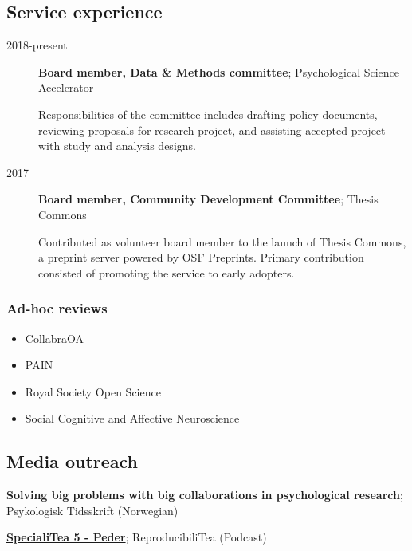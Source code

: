 \documentclass[]{article}
\providecommand{\tightlist}{%
  \setlength{\itemsep}{0pt}\setlength{\parskip}{0pt}}
\begin{document}
\subsection{Service experience}\label{service-experience}

\begin{description}
\item[2018-present]
\textbf{Board member, Data \& Methods committee}; Psychological Science
Accelerator

Responsibilities of the committee includes drafting policy documents,
reviewing proposals for research project, and assisting accepted project
with study and analysis designs.
\item[2017]
\textbf{Board member, Community Development Committee}; Thesis Commons

Contributed as volunteer board member to the launch of Thesis Commons, a
preprint server powered by OSF Preprints. Primary contribution consisted
of promoting the service to early adopters.
\end{description}

\subsubsection{Ad-hoc reviews}\label{ad-hoc-reviews}

\begin{itemize}
\tightlist
\item
  CollabraOA
\item
  PAIN
\item
  Royal Society Open Science
\item
  Social Cognitive and Affective Neuroscience
\end{itemize}

\subsection{Media outreach}\label{media-outreach}

\begin{description}
\tightlist
\item[2018]
\textbf{Solving big problems with big collaborations in psychological
research}; Psykologisk Tidsskrift (Norwegian)\\
\item[2018]
\textbf{\href{https://soundcloud.com/reproducibilitea/specialitea-5-peder}{SpecialiTea
5 - Peder}}; ReproducibiliTea (Podcast)
\end{description}
\end{document}
